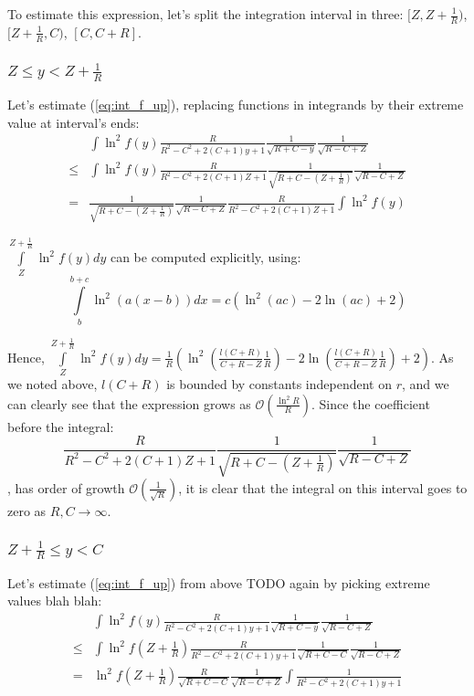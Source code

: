 \documentclass[12pt, a4paper]{article}
\theoremstyle{plain}
\newcommand{\mcO}{\mathcal{O}} %
\begin{document}
To estimate this expression, let's split the integration interval in three: $[Z, Z + \frac{1}{R})$, $[Z + \frac{1}{R}, C)$, $[C, C + R]$.

\subsubsection{$Z \le y < Z + \frac{1}{R}$}

Let's estimate (\ref{eq:int_f_up}), replacing functions in integrands by their extreme value at interval's ends:
\begin{align*}
       & \int \ln^2 f(y) \frac{R}{R^2 - C^2 + 2 (C + 1) y + 1} \frac{1}{\sqrt{R + C - y}} \frac{1}{\sqrt{R - C + Z}}
\\ \le & \int \ln^2 f(y) \frac{R}{R^2 - C^2 + 2 (C + 1) Z + 1} \frac{1}{\sqrt{R + C - (Z + \frac{1}{R})}} \frac{1}{\sqrt{R - C + Z}}
\\ =   & \frac{1}{\sqrt{R + C - (Z + \frac{1}{R})}} \frac{1}{\sqrt{R - C + Z}} \frac{R}{R^2 - C^2 + 2 (C + 1) Z + 1} \int \ln^2 f(y) 
\end{align*}

$\int\limits_{Z}^{Z + \frac{1}{R}} \ln^2 f(y) dy$ can be computed explicitly, using:
\[
    \int\limits_b^{b + c} \ln^2 (a (x - b)) dx = c (\ln^2(a c) - 2 \ln (a c) + 2)
\]

Hence, $\int\limits_{Z}^{Z + \frac{1}{R}} \ln^2 f(y) dy = \frac{1}{R} ( \ln^2 (\frac{l(C + R)}{C + R - Z} \frac{1}{R}) - 2 \ln (\frac{l(C + R)}{C + R - Z} \frac{1}{R}) + 2)$. As we noted above, $l(C + R)$ is bounded by constants independent on $r$, and we can clearly see that the expression grows as $\mcO(\frac{\ln^2 R}{R})$. Since the coefficient before the integral:
\[
\frac{R}{R^2 - C^2 + 2 (C + 1) Z + 1} \frac{1}{\sqrt{R + C - (Z + \frac{1}{R})}} \frac{1}{\sqrt{R - C + Z}}
\]
, has order of growth $\mcO\left(\frac{1}{\sqrt{R}}\right)$, it is clear that the integral on this interval goes to zero as $R, C \to \infty$.

\subsubsection{$Z + \frac{1}{R} \le y < C$}
Let's estimate (\ref{eq:int_f_up}) from above TODO again by picking extreme values blah blah:
\begin{align*}
       & \int \ln^2 f(y) \frac{R}{R^2 - C^2 + 2 (C + 1) y + 1} \frac{1}{\sqrt{R + C - y}} \frac{1}{\sqrt{R - C + Z}}
\\ \le & \int \ln^2 f(Z + \frac{1}{R}) \frac{R}{R^2 - C^2 + 2 (C + 1) y + 1} \frac{1}{\sqrt{R + C - C}} \frac{1}{\sqrt{R - C + Z}}
\\  =  & \ln^2 f(Z + \frac{1}{R})  \frac{R}{\sqrt{R + C - C}} \frac{1}{\sqrt{R - C + Z}} \int \frac{1}{R^2 - C^2 + 2 (C + 1) y + 1}
\end{align*}
\end{document}
